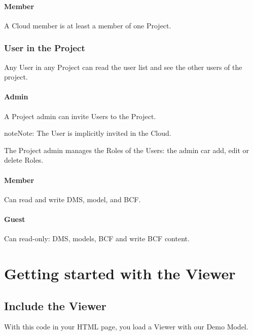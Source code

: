 \documentclass[a4paper,12pt,english]{sphinxmanual}
\begin{document}
\paragraph{Member}
\label{\detokenize{tutorials/guided_tour:member}}
A Cloud member is at least a member of one Project.


\subsubsection{User in the Project}
\label{\detokenize{tutorials/guided_tour:user-in-the-project}}
Any User in any Project can read the user list and see the other users of the project.


\paragraph{Admin}
\label{\detokenize{tutorials/guided_tour:id1}}
A Project admin can invite Users to the Project.

\begin{sphinxadmonition}{note}{Note:}
The User is implicitly invited in the Cloud.
\end{sphinxadmonition}

The Project admin manages the Roles of the Users: the admin car add, edit or delete Roles.


\paragraph{Member}
\label{\detokenize{tutorials/guided_tour:id2}}
Can read and write DMS, model, and BCF.


\paragraph{Guest}
\label{\detokenize{tutorials/guided_tour:guest}}
Can read-only: DMS, models, BCF and write BCF content.


\section{Getting started with the Viewer}
\label{\detokenize{viewer/getting_started:getting-started-with-the-viewer}}\label{\detokenize{viewer/getting_started::doc}}


\subsection{Include the Viewer}
\label{\detokenize{viewer/getting_started:include-the-viewer}}
With this code in your HTML page, you load a Viewer with our Demo Model.
\end{document}
